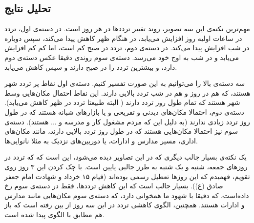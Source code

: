 \subsection{تحلیل نتایج}

مهم‌ترین نکته‌ی این سه تصویر، روند تغییر تردد‌ها در هر روز است. در دسته‌ی اول، 
تردد در ساعات اولیه روز افزایش می‌یابد، در هنگام ظهر کاهش پیدا می‌کند، سپس دوباره در 
شب افزایش پیدا می‌کند. در دسته‌ی دوم، تردد در صبح کم است، اما کم کم افزایش می‌یابد و در شب 
به اوج خود می‌رسد. دسته‌ی سوم روندی دقیقا عکس دسته‌ی دوم دارد، و بیشترین تردد را در صبح 
دارند و سپس کاهش می‌یابد. 

سه دسته‌ی بالا را می‌توانیم به این صورت تفسیر کنیم. دسته‌ی اول نقاط پر تردد شهر هستند، که هم در روز 
و هم در شب تردد بالایی دارند. این نقاط احتمال مکان‌هایی وسط شهر هستند که تمام 
طول روز تردد دارند ( البته طبیعتا تردد در ظهر کاهش می‌یابد). 
دسته‌ی دوم، احتمالا مکان‌های دیدنی و تفریحی و یا بازار‌های شبانه هستند 
که در طول روز تردد زیادی ندارند (به دلیل این که مردم مشغول کار و مدرسه و ... هستند). 
دسته‌ی سوم نیز احتمالا مکان‌هایی هستند که در طول روز تردد بالایی دارند، مانند مکان‌های اداری، مسیر مدارس و ادارات، یا دوربین‌های نزدیک به مثلا نانوایی‌ها. 

یک نکته‌ی بسیار جالب دیگری که در این تصاویر دیده می‌شود، این است که که تردد 
در روز‌های جمعه، شنبه و یک شنبه به طرز جالبی پایین است. با چک کردن این ۳ روز روی تقویم، فهمیدم که این روز‌ها 
تعطیل رسمی بوده‌اند (قیام ۱۵ خرداد و شهادت امام جعفر صادق (ع)). بسیار جالب است که این کاهش 
ترددها، فقط در دسته‌ی سوم رخ داده‌است، که دقیقا با شهود ما همخوانی دارد، که دسته‌ی سوم مکان‌هایی 
مانند مدارس و ادارات هستند. همچنین، الگوی کاهشی تردد در این سه روز از بین رفته‌ است 
که باز هم مطابق با الگوی پیدا شده است. 